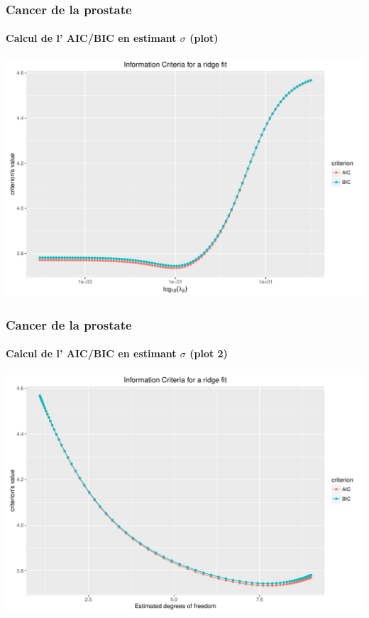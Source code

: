 \documentclass{beamer}\usepackage[]{graphicx}\usepackage[]{color}
\newenvironment{knitrout}{}{} %
\begin{document}
\begin{frame}[containsverbatim]
  \frametitle{Cancer de la prostate}
  \framesubtitle{Calcul de l' AIC/BIC en estimant $\sigma$ (plot)}

\begin{knitrout}\scriptsize
{}\color{fgcolor}
\includegraphics[width=\textwidth]{figures/toy_ridgeunnamed-chunk-52-1} 

\end{knitrout}
\end{frame}

\begin{frame}[containsverbatim]
  \frametitle{Cancer de la prostate}
  \framesubtitle{Calcul de l' AIC/BIC en estimant $\sigma$ (plot 2)}

\begin{knitrout}\scriptsize
{}\color{fgcolor}
\includegraphics[width=\textwidth]{figures/toy_ridgeunnamed-chunk-53-1} 

\end{knitrout}
\end{frame}
\end{document}
